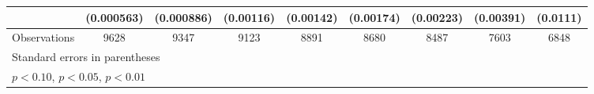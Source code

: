 \begin{table}[htbp]
\begin{tabular}{l*{8}{c}}
                    &  (0.000563)         &  (0.000886)         &   (0.00116)         &   (0.00142)         &   (0.00174)         &   (0.00223)         &   (0.00391)         &    (0.0111)         \\
\hline
Observations        &        9628         &        9347         &        9123         &        8891         &        8680         &        8487         &        7603         &        6848         \\
\hline\hline
\multicolumn{9}{l}{\footnotesize Standard errors in parentheses}\\
\multicolumn{9}{l}{\footnotesize \sym{*} \(p<0.10\), \sym{**} \(p<0.05\), \sym{***} \(p<0.01\)}\\
\end{tabular}
\end{table}
